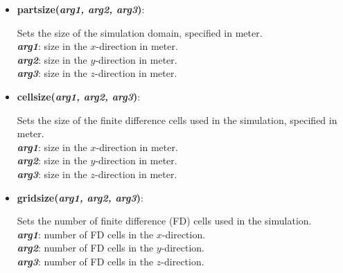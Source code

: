 \begin{itemize}
 \item {\textbf{partsize(\textit{arg1, arg2, arg3})}:
				\flushright\parbox{0.9 \textwidth}{\vspace{-0.25cm} 
				Sets the size of the simulation domain, specified in meter.\\
				\textbf{\textit{arg1}}: size in the $x$-direction in meter.\\
				\textbf{\textit{arg2}}: size in the $y$-direction in meter.\\
				\textbf{\textit{arg3}}: size in the $z$-direction in meter.
				}\flushleft}

 \item {\vspace{-0.4cm}\textbf{cellsize(\textit{arg1, arg2, arg3})}:
				\flushright\parbox{0.9 \textwidth}{\vspace{-0.25cm} 
				Sets the size of the finite difference cells used in the simulation, specified in meter.\\
				\textbf{\textit{arg1}}: size in the $x$-direction in meter.\\
				\textbf{\textit{arg2}}: size in the $y$-direction in meter.\\
				\textbf{\textit{arg3}}: size in the $z$-direction in meter.
				}\flushleft}

 \item {\vspace{-0.4cm}\textbf{gridsize(\textit{arg1, arg2, arg3})}:
				\flushright\parbox{0.9 \textwidth}{\vspace{-0.25cm} 
				Sets the number of finite difference (FD) cells used in the simulation.\\
				\textbf{\textit{arg1}}: number of FD cells in the $x$-direction.\\
				\textbf{\textit{arg2}}: number of FD cells in the $y$-direction.\\
				\textbf{\textit{arg3}}: number of FD cells in the $z$-direction.
				}\flushleft}

\end{itemize}


